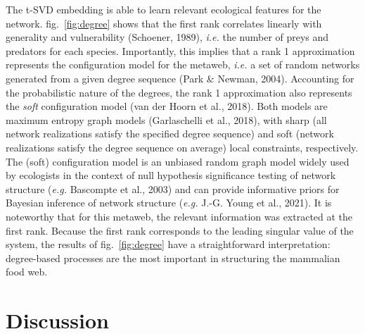 \documentclass[10pt,oneside]{article}
\begin{document}
The t-SVD embedding is able to learn relevant ecological features for
the network. fig.~\ref{fig:degree} shows that the first rank correlates
linearly with generality and vulnerability (Schoener, 1989), \emph{i.e.}
the number of preys and predators for each species. Importantly, this
implies that a rank 1 approximation represents the configuration model
for the metaweb, \emph{i.e.} a set of random networks generated from a
given degree sequence (Park \& Newman, 2004). Accounting for the
probabilistic nature of the degrees, the rank 1 approximation also
represents the \emph{soft} configuration model (van der Hoorn et al.,
2018). Both models are maximum entropy graph models (Garlaschelli et
al., 2018), with sharp (all network realizations satisfy the specified
degree sequence) and soft (network realizations satisfy the degree
sequence on average) local constraints, respectively. The (soft)
configuration model is an unbiased random graph model widely used by
ecologists in the context of null hypothesis significance testing of
network structure (\emph{e.g.} Bascompte et al., 2003) and can provide
informative priors for Bayesian inference of network structure
(\emph{e.g.} J.-G. Young et al., 2021). It is noteworthy that for this
metaweb, the relevant information was extracted at the first rank.
Because the first rank corresponds to the leading singular value of the
system, the results of fig.~\ref{fig:degree} have a straightforward
interpretation: degree-based processes are the most important in
structuring the mammalian food web.

\hypertarget{discussion}{%
\section{Discussion}\label{discussion}}
\end{document}
